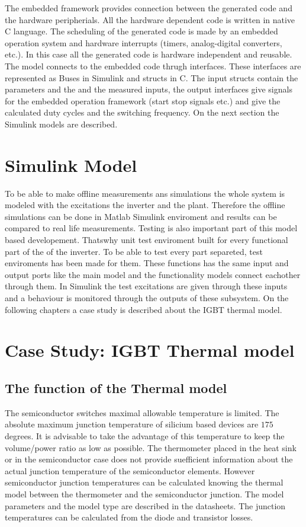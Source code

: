 The embedded framework provides connection between the generated code and the hardware peripherials. All the hardware dependent code is written in native C language. The scheduling of the generated code is made by an embedded operation system and hardware interrupts (timers, analog-digital converters, etc.). In this case all the generated code is hardware independent and reusable. The model connects to the embedded code thrugh interfaces. These interfaces are represented as Buses in Simulink and structs in C. The input structs contain the parameters and the and the measured inputs, the output interfaces give signals for the embedded operation framework (start stop signals etc.) and give the calculated duty cycles and the switching frequency. On the next section the Simulink models are described. 

\section{Simulink Model}
To be able to make offline measurements ans simulations the whole system is modeled with the excitations the inverter and the plant. Therefore the offline simulations can be done in Matlab Simulink enviroment and results can be compared to real life measurements. Testing is also important part of this model based developement. Thatswhy unit test enviroment built for every functional part of the of the inverter. To be able to test every part separeted, test enviroments has been made for them. These functions has the same input and output ports like the main model and the functionality models connect eachother through them. In Simulink the test excitations are given through these inputs and a behaviour is monitored through the outputs of these subsystem.  On the following chapters a case study is described about the IGBT thermal model.
\section{Case Study: IGBT Thermal model}

\subsection{The function of the Thermal model}
The semiconductor switches maximal allowable temperature is limited. The absolute maximum junction temperature of silicium based devices  are $175$ degrees. It is advisable to take the advantage of this temperature to keep the volume/power ratio as low as possible. The thermometer placed in the heat sink or in the semiconductor case does not provide suefficient information about the actual junction temperature of the semiconductor elements. However semiconductor junction temperatures can be calculated knowing the thermal model between the thermometer and the semiconductor junction. The model parameters and the model type are described in the datasheets. The junction temperatures can be calculated from the diode and transistor losses.

